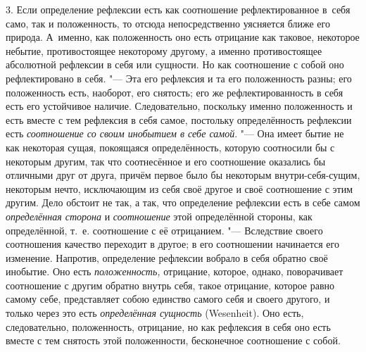 3. Если определение рефлексии есть как соотношение рефлектированное в~себя
само, так и положенность, то отсюда непосредственно уясняется ближе его
природа. А~именно, как положенность оно есть отрицание как таковое,
некоторое небытие, противостоящее некоторому другому, а именно
противостоящее абсолютной рефлексии в себя или сущности. Но как соотношение
с собой оно рефлектировано в себя. "--- Эта его рефлексия и та его положенность
разны; его положенность есть, наоборот, его снятость; его же
рефлектированность в себя есть его устойчивое наличие. Следовательно,
поскольку именно положенность и есть вместе с тем рефлексия в себя самое,
постольку определённость рефлексии есть
{\em соотношение со своим инобытием в себе самой}. "---
Она имеет бытие не как некоторая сущая, покоящаяся определённость, которую
соотносили бы с некоторым другим, так что соотнесённое и его соотношение
оказались бы отличными друг от друга, причём первое было бы некоторым
внутри-себя-сущим, некоторым нечто, исключающим из себя своё другое и своё
соотношение с этим другим. Дело обстоит не так, а так, что определение
рефлексии есть в себе самом {\em определённая сторона}
и {\em соотношение} этой определённой стороны, как
определённой, т.~е. соотношение с её отрицанием. "--- Вследствие своего
соотношения качество переходит в другое; в его соотношении начинается его
изменение. Напротив, определение рефлексии вобрало в себя обратно своё
инобытие. Оно есть {\em положенность,} отрицание,
которое, однако, поворачивает соотношение с другим обратно внутрь себя,
такое отрицание, которое равно самому себе, представляет собою единство
самого себя и своего другого, и только через это есть
{\em определённая сущность} (Wesenheit). Оно есть,
следовательно, положенность, отрицание, но как рефлексия в себя оно есть
вместе с тем снятость этой положенности, бесконечное соотношение с собой.

